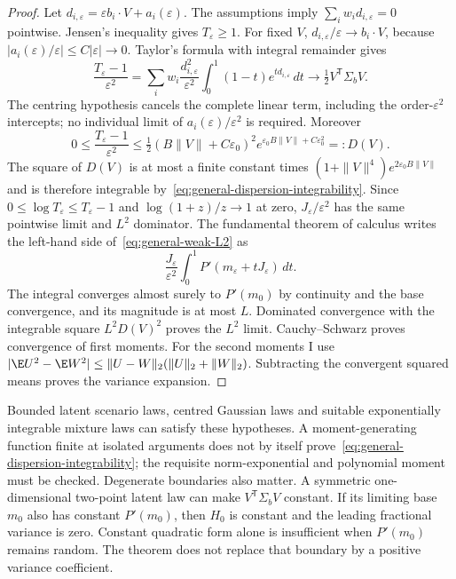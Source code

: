 \begin{proof}
Let $d_{i,\varepsilon}=\varepsilon b_i\cdot V+a_i(\varepsilon)$.
The assumptions imply $\sum_iw_i d_{i,\varepsilon}=0$ pointwise.
Jensen's inequality gives $T_\varepsilon\geq1$.
For fixed $V$, $d_{i,\varepsilon}/\varepsilon\to b_i\cdot V$, because
$|a_i(\varepsilon)/\varepsilon|\leq C|\varepsilon|\to0$.
Taylor's formula with integral remainder gives
\begin{equation}
 \frac{T_\varepsilon-1}{\varepsilon^2}
 =\sum_iw_i\frac{d_{i,\varepsilon}^2}{\varepsilon^2}
                 \int_0^1(1-t)e^{t d_{i,\varepsilon}}\,dt
 \longrightarrow\tfrac12V^{\mathsf T}\Sigma_b V.
\end{equation}
The centring hypothesis cancels the complete linear term, including
the order-$\varepsilon^2$ intercepts; no individual limit of
$a_i(\varepsilon)/\varepsilon^2$ is required.
Moreover
\begin{equation}
 0\leq\frac{T_\varepsilon-1}{\varepsilon^2}
 \leq\tfrac12(B\|V\|+C\varepsilon_0)^2
           e^{\varepsilon_0B\|V\|+C\varepsilon_0^2}
 =:D(V).
\end{equation}
The square of $D(V)$ is at most a finite constant times
$(1+\|V\|^4)e^{2\varepsilon_0B\|V\|}$ and is therefore integrable
by~\eqref{eq:general-dispersion-integrability}.
Since $0\leq\log T_\varepsilon\leq T_\varepsilon-1$ and
$\log(1+z)/z\to1$ at zero, $J_\varepsilon/\varepsilon^2$ has the
same pointwise limit and $L^2$ dominator.
The fundamental theorem of calculus writes the left-hand side
of~\eqref{eq:general-weak-L2} as
\begin{equation}
 \frac{J_\varepsilon}{\varepsilon^2}
       \int_0^1P'(m_\varepsilon+tJ_\varepsilon)\,dt.
\end{equation}
The integral converges almost surely to $P'(m_0)$ by continuity
and the base convergence, and its magnitude is at most $L$.
Dominated convergence with the integrable square $L^2D(V)^2$ proves
the $L^2$ limit. Cauchy--Schwarz proves convergence of first moments.
For the second moments I use
$|\E U^2-\E W^2|\leq\|U-W\|_2(\|U\|_2+\|W\|_2)$.
Subtracting the convergent squared means proves the variance expansion.
\end{proof}

Bounded latent scenario laws, centred Gaussian laws and suitable
exponentially integrable mixture laws can satisfy these hypotheses.
A moment-generating function finite at isolated arguments does not by
itself prove~\eqref{eq:general-dispersion-integrability}; the requisite
norm-exponential and polynomial moment must be checked. Degenerate
boundaries also matter. A symmetric one-dimensional two-point latent law
can make $V^{\mathsf T}\Sigma_bV$ constant. If its limiting base $m_0$
also has constant $P'(m_0)$, then $H_0$ is constant and the leading
fractional variance is zero. Constant quadratic form alone is
insufficient when $P'(m_0)$ remains random. The theorem does not replace
that boundary by a positive variance coefficient.


